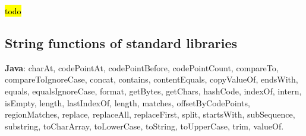 \documentclass[anonymous,sigplan,review,11pt,nonacm,natbib=false]{acmart}
\begin{document}
    \hl{todo}

    \subsection{String functions of standard libraries}

    \textbf{Java}: charAt, codePointAt, codePointBefore, codePointCount, compareTo, compareToIgnoreCase, concat, contains, contentEquals, copyValueOf, endsWith, equals, equalsIgnoreCase, format, getBytes, getChars, hashCode, indexOf, intern, isEmpty, length, lastIndexOf, length, matches, offsetByCodePoints, regionMatches, replace, replaceAll, replaceFirst, split, startsWith, subSequence, substring, toCharArray, toLowerCase, toString, toUpperCase, trim, valueOf.

    \printbibliography
\end{document}
